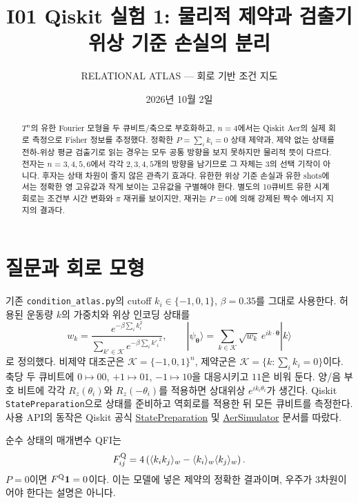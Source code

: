 \documentclass[11pt,a4paper]{article}
\title{I01 Qiskit 실험 1: 물리적 제약과 검출기 위상 기준 손실의 분리}
\author{RELATIONAL ATLAS --- 회로 기반 조건 지도}
\date{2026년 10월 2일}
\begin{document}
\maketitle

\begin{abstract}
$T^n$의 유한 Fourier 모형을 두 큐비트/축으로 부호화하고,
$n=4$에서는 Qiskit Aer의 실제 회로 측정으로 Fisher 정보를 추정했다.
정확한 $P=\sum_i k_i=0$ 상태 제약과, 제약 없는 상태를 전하-위상 평균
검출기로 읽는 경우는 모두 공통 방향을 보지 못하지만 물리적 뜻이 다르다.
전자는 $n=3,4,5,6$에서 각각 $2,3,4,5$개의 방향을 남기므로
그 자체는 3의 선택 기작이 아니다. 후자는 상태 차원이 줄지 않은
관측기 효과다. 유한한 위상 기준 손실과 유한 shots에서는 정확한 영 고유값과
작게 보이는 고유값을 구별해야 한다. 별도의 10큐비트 유한 시계 회로는
조건부 시간 변화와 $\pi$ 재귀를 보이지만, 재귀는 $P=0$에 의해
강제된 짝수 에너지 지지의 결과다.
\end{abstract}

\section{질문과 회로 모형}
기존 \texttt{condition\_atlas.py}의 cutoff $k_i\in\{-1,0,1\}$,
$\beta=0.35$를 그대로 사용한다. 허용된 운동량 $k$의 가중치와
위상 인코딩 상태를
\begin{equation}
 w_k=\frac{e^{-\beta\sum_i k_i^2}}{\sum_{k'\in\mathcal K}e^{-\beta\sum_i {k'_i}^2}},
 \qquad
 |\psi_{\boldsymbol\theta}\rangle
 =\sum_{k\in\mathcal K}\sqrt{w_k}\,
 e^{i k\cdot\boldsymbol\theta}|k\rangle
\end{equation}
로 정의했다. 비제약 대조군은 $\mathcal K=\{-1,0,1\}^n$,
제약군은 $\mathcal K=\{k:\sum_i k_i=0\}$이다. 축당 두 큐비트에
$0\mapsto 00$, $+1\mapsto 01$, $-1\mapsto 10$을 대응시키고
$11$은 비워 둔다. 양/음 부호 비트에 각각 $R_z(\theta_i)$와
$R_z(-\theta_i)$를 적용하면 상대위상 $e^{ik_i\theta_i}$가 생긴다.
Qiskit \texttt{StatePreparation}으로 상태를 준비하고 역회로를 적용한 뒤
모든 큐비트를 측정한다. 사용 API의 동작은 Qiskit 공식
\href{https://quantum.cloud.ibm.com/docs/api/qiskit/qiskit.circuit.library.StatePreparation}{StatePreparation}
및 \href{https://qiskit.github.io/qiskit-aer/stubs/qiskit_aer.AerSimulator.html}{AerSimulator}
문서를 따랐다.

순수 상태의 매개변수 QFI는
\begin{equation}
 F^{\rm Q}_{ij}=4\left(\langle k_i k_j\rangle_w
 -\langle k_i\rangle_w\langle k_j\rangle_w\right).
\end{equation}
$P=0$이면 $F^{\rm Q}\boldsymbol 1=0$이다. 이는 모델에 넣은
제약의 정확한 결과이며, 우주가 3차원이어야 한다는 설명은 아니다.
\end{document}
